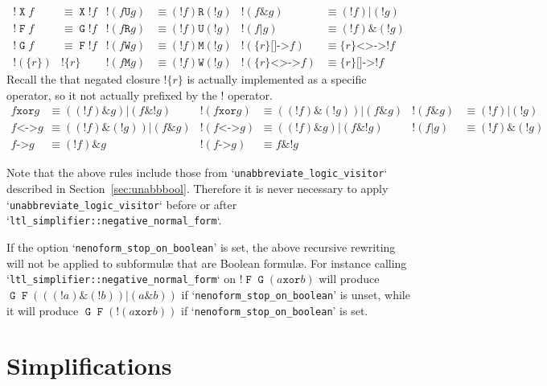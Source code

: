\documentclass[a4paper,twoside,10pt,DIV=12,draft]{scrreprt}
\DeclareMathOperator{\F}{\texttt{F}}
\DeclareMathOperator{\G}{\texttt{G}}
\newcommand{\U}{\mathbin{\texttt{U}}}
\newcommand{\R}{\mathbin{\texttt{R}}}
\DeclareMathOperator{\X}{\texttt{X}}
\newcommand{\M}{\mathbin{\texttt{M}}}
\newcommand{\W}{\mathbin{\texttt{W}}}
\DeclareMathOperator{\NOT}{\texttt{!}}
\newcommand{\XOR}{\mathbin{\texttt{xor}}}
\newcommand{\IMPLIES}{\mathbin{\texttt{->}}}
\newcommand{\EQUIV}{\mathbin{\texttt{<->}}}
\newcommand{\OR}{\mathbin{\texttt{|}}}
\newcommand{\AND}{\mathbin{\texttt{\&}}}
\newcommand{\0}{\texttt{0}}
\newcommand{\1}{\texttt{1}}
\newcommand{\Esuffix}{\texttt{<>->}}
\newcommand{\Asuffix}{\texttt{[]->}}
\newcommand{\ratgroup}[1]{\texttt{\{}#1\texttt{\}}}
\newcommand{\nratgroup}[1]{\texttt{!\{}#1\texttt{\}}}
\begin{document}
\begin{align*}
  \NOT\X f & \equiv \X\NOT f &
  \NOT(f \U g) & \equiv (\NOT f) \R (\NOT g) &
  \NOT(f \AND g)&\equiv (\NOT f) \OR (\NOT g)
  \\
  \NOT\F f & \equiv \G\NOT f &
  \NOT(f \R g) & \equiv (\NOT f) \U (\NOT g) &
  \NOT(f \OR g)&\equiv (\NOT f)\AND (\NOT g)
  \\
  \NOT\G f & \equiv \F\NOT f &
  \NOT(f \W g) & \equiv (\NOT f) \M (\NOT g) &
  \NOT(\ratgroup{r} \Asuffix f) &\equiv \ratgroup{r} \Esuffix \NOT f
  \\
  \NOT(\ratgroup{r})&\nratgroup{r}&
  \NOT(f \M g) & \equiv (\NOT f) \W (\NOT g)&
  \NOT(\ratgroup{r} \Esuffix f) &\equiv \ratgroup{r} \Asuffix \NOT f
\end{align*}
\noindent Recall the that negated closure $\nratgroup{r}$ is actually
implemented as a specific operator, so it not actually prefixed by the
$\NOT$ operator.
\begin{align*}
  f \XOR g & \equiv ((\NOT f)\AND g)\OR(f\AND\NOT g) &
  \NOT(f \XOR g) & \equiv ((\NOT f)\AND(\NOT g))\OR(f\AND g) &
  \NOT(f \AND g) & \equiv (\NOT f)\OR(\NOT g) \\
  f \EQUIV g & \equiv ((\NOT f)\AND(\NOT g))\OR(f\AND g) &
  \NOT(f \EQUIV g) & \equiv ((\NOT f)\AND g)\OR(f\AND\NOT g) &
  \NOT(f \OR g) & \equiv (\NOT f)\AND(\NOT g) \\
  f \IMPLIES g & \equiv (\NOT f) \AND g &
  \NOT(f \IMPLIES g) & \equiv f \AND \NOT g
\end{align*}

Note that the above rules include those from
`\verb=unabbreviate_logic_visitor=` described in
Section~\ref{sec:unabbbool}.  Therefore it is never necessary to apply
`\verb=unabbreviate_logic_visitor=` before or after
`\verb|ltl_simplifier::negative_normal_form|`.

If the option `\verb|nenoform_stop_on_boolean|' is set, the above
recursive rewriting will not be applied to subformul\ae{} that are
Boolean formul\ae.  For instance calling
`\verb|ltl_simplifier::negative_normal_form|` on $\NOT\F\G(a \XOR b)$
will produce $\G\F(((\NOT a)\AND(\NOT b))\OR(a\AND b))$ if
`\verb|nenoform_stop_on_boolean|' is unset, while it will produce
$\G\F(\NOT(a \XOR b))$ if `\verb|nenoform_stop_on_boolean|' is set.

\section{Simplifications}
\end{document}
